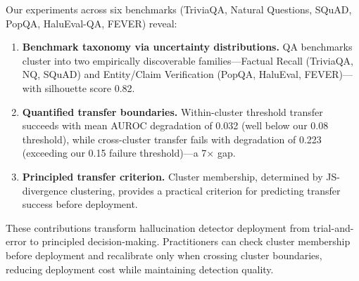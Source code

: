 Our experiments across six benchmarks (TriviaQA, Natural Questions, SQuAD, PopQA, HaluEval-QA, FEVER) reveal:

\begin{enumerate}
    \item \textbf{Benchmark taxonomy via uncertainty distributions.} QA benchmarks cluster into two empirically discoverable families---Factual Recall (TriviaQA, NQ, SQuAD) and Entity/Claim Verification (PopQA, HaluEval, FEVER)---with silhouette score 0.82.

    \item \textbf{Quantified transfer boundaries.} Within-cluster threshold transfer succeeds with mean AUROC degradation of 0.032 (well below our 0.08 threshold), while cross-cluster transfer fails with degradation of 0.223 (exceeding our 0.15 failure threshold)---a 7$\times$ gap.

    \item \textbf{Principled transfer criterion.} Cluster membership, determined by JS-divergence clustering, provides a practical criterion for predicting transfer success before deployment.
\end{enumerate}

These contributions transform hallucination detector deployment from trial-and-error to principled decision-making. Practitioners can check cluster membership before deployment and recalibrate only when crossing cluster boundaries, reducing deployment cost while maintaining detection quality.

